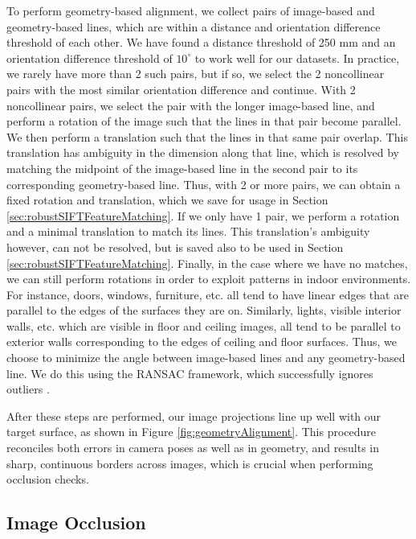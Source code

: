 \documentclass[]{spie}  %
\begin{document}
To perform geometry-based alignment, we collect pairs of image-based
and geometry-based lines, which are within a distance and orientation
difference threshold of each other. We have found a distance threshold
of 250 mm and an orientation difference threshold of $10^\circ$ to
work well for our datasets. In practice, we rarely have more than 2
such pairs, but if so, we select the 2 noncollinear pairs with the
most similar orientation difference and continue. With 2 noncollinear
pairs, we select the pair with the longer image-based line, and
perform a rotation of the image such that the lines in that pair
become parallel. We then perform a translation such that the lines in
that same pair overlap. This translation has ambiguity in the
dimension along that line, which is resolved by matching the midpoint
of the image-based line in the second pair to its corresponding
geometry-based line. Thus, with 2 or more pairs, we can obtain a fixed
rotation and translation, which we save for usage in Section
\ref{sec:robustSIFTFeatureMatching}. If we only have 1 pair, we
perform a rotation and a minimal translation to match its lines. This
translation's ambiguity however, can not be resolved, but is saved
also to be used in Section
\ref{sec:robustSIFTFeatureMatching}. Finally, in the case where we
have no matches, we can still perform rotations in order to exploit
patterns in indoor environments. For instance, doors, windows,
furniture, etc. all tend to have linear edges that are parallel to the
edges of the surfaces they are on. Similarly, lights, visible interior
walls, etc. which are visible in floor and ceiling images, all tend to
be parallel to exterior walls corresponding to the edges of ceiling
and floor surfaces. Thus, we choose to minimize the angle between
image-based lines and any geometry-based line. We do this using the
RANSAC framework, which successfully ignores outliers
\cite{fischler1981random}. 

After these steps are performed, our image projections line up well with our target surface, as shown in Figure \ref{fig:geometryAlignment}. This procedure reconciles both errors in camera poses as well as in geometry, and results in sharp, continuous borders across images, which is crucial when performing occlusion checks.


\subsection{Image Occlusion}
\label{sec:imageOcclusion}
\end{document}
